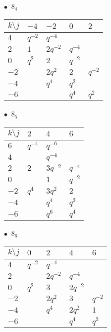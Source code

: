 %
\begin{minipage}{\linewidth}
$\bullet\ $ $8_{4}$ \vspace{0.5em} \\
\begin{tabular}{l|llll}
$k \setminus j$ & $-4$ & $-2$ & $0$ & $2$ \\
\hline
$4$ & $q^{-2}$ & $q^{-4}$ &  &  \\
$2$ & $1$ & $2q^{-2}$ & $q^{-4}$ &  \\
$0$ & $q^{2}$ & $2$ & $q^{-2}$ &  \\
$-2$ &  & $2q^{2}$ & $2$ & $q^{-2}$ \\
$-4$ &  & $q^{4}$ & $q^{2}$ &  \\
$-6$ &  &  & $q^{4}$ & $q^{2}$ \\
\end{tabular}
\vspace{2em}
\end{minipage}
%
\begin{minipage}{\linewidth}
$\bullet\ $ $8_{5}$ \vspace{0.5em} \\
\begin{tabular}{l|lll}
$k \setminus j$ & $2$ & $4$ & $6$ \\
\hline
$6$ & $q^{-4}$ & $q^{-6}$ &  \\
$4$ &  & $q^{-4}$ &  \\
$2$ & $2$ & $3q^{-2}$ & $q^{-4}$ \\
$0$ &  & $1$ & $q^{-2}$ \\
$-2$ & $q^{4}$ & $3q^{2}$ & $2$ \\
$-4$ &  & $q^{4}$ & $q^{2}$ \\
$-6$ &  & $q^{6}$ & $q^{4}$ \\
\end{tabular}
\vspace{2em}
\end{minipage}
%
\begin{minipage}{\linewidth}
$\bullet\ $ $8_{6}$ \vspace{0.5em} \\
\begin{tabular}{l|llll}
$k \setminus j$ & $0$ & $2$ & $4$ & $6$ \\
\hline
$4$ & $q^{-2}$ & $q^{-4}$ &  &  \\
$2$ &  & $2q^{-2}$ & $q^{-4}$ &  \\
$0$ & $q^{2}$ & $3$ & $2q^{-2}$ &  \\
$-2$ &  & $2q^{2}$ & $3$ & $q^{-2}$ \\
$-4$ &  & $q^{4}$ & $2q^{2}$ & $1$ \\
$-6$ &  &  & $q^{4}$ & $q^{2}$ \\
\end{tabular}
\vspace{2em}
\end{minipage}
